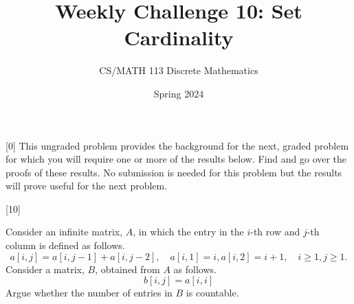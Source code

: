 \documentclass[a4paper]{exam}
\title{Weekly Challenge 10: Set Cardinality}
\author{CS/MATH 113 Discrete Mathematics}
\date{Spring 2024}
\begin{document}
\maketitle

\begin{questions}

[0]
  This ungraded problem provides the background for the next, graded problem for which you will require one or more of the results below. Find and go over the proofs of these results. No submission is needed for this problem but the results will prove useful for the next problem.
  


[10]

  Consider an infinite matrix, $A$, in which the entry in the $i$-th row and $j$-th column is defined as follows.
  \[
    a[i,j] = a[i,j-1] + a[i,j-2], \quad a[i,1] = i, a[i,2] = i+1, \quad i\geq 1, j\geq 1.
  \]
  Consider a matrix, $B$, obtained from $A$ as follows.
  \[
    b[i,j]= a[i,i]
  \]
  Argue whether the number of entries in $B$ is countable.
  
    \begin{solution}

    \end{solution}

\end{questions}
\end{document}
